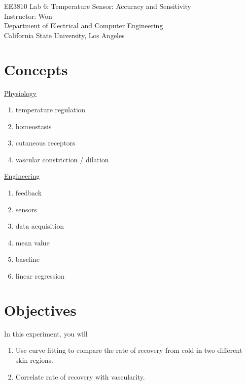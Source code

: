 \documentclass[12pt,oneside]{article}
\begin{document}
\begin{center}
\Large{EE3810 Lab 6: Temperature Sensor: Accuracy and Sensitivity\\}
\large{Instructor: Won\\
Department of Electrical and Computer Engineering\\
California State University, Los Angeles\\}
\end{center}

\section{Concepts}
\begin{multicols}{2}
\underline{Physiology}
\begin{enumerate}
\item temperature regulation
\item homeostasis
\item cutaneous receptors
\item vascular constriction / dilation
\end{enumerate}

\columnbreak

\underline{Engineering}
\begin{enumerate}
\item feedback
\item sensors
\item data acquisition
\item mean value
\item baseline
\item linear regression
\end{enumerate}

\end{multicols}

\section{Objectives} 
In this experiment, you will
\begin{enumerate}
\item Use curve fitting to compare the rate of recovery from cold in two different skin regions.
\item  Correlate rate of recovery with vascularity.
\end{enumerate}
\end{document}
